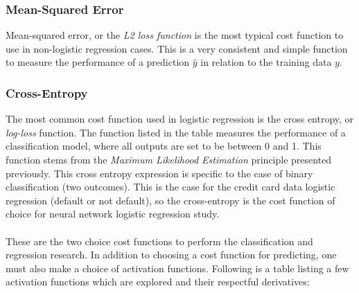         \subsubsection{Mean-Squared Error}
            Mean-squared error, or the \textit{L2 loss function} is the most typical cost function to use in non-logistic regression cases. This is a very consistent and simple function to measure the performance of a prediction $\hat{y}$ in relation to the training data $y$.
        \subsubsection{Cross-Entropy}
            The most common cost function used in logistic regression is the cross entropy, or \textit{log-loss} function. The function listed in the table measures the performance of a classification model, where all outputs are set to be between 0 and 1. This function stems from the \textit{Maximum Likelihood Estimation} principle presented previously.
            This cross entropy expression is specific to the case of binary classification (two outcomes). This is the case for the credit card data logistic regression (default or not default), so the cross-entropy is the cost function of choice for neural network logistic regression study. \\\\
        These are the two choice cost functions to perform the classification and regression research. In addition to choosing a cost function for predicting, one must also make a choice of activation functions. Following is a table listing a few activation functions which are explored and their respectful derivatives:
